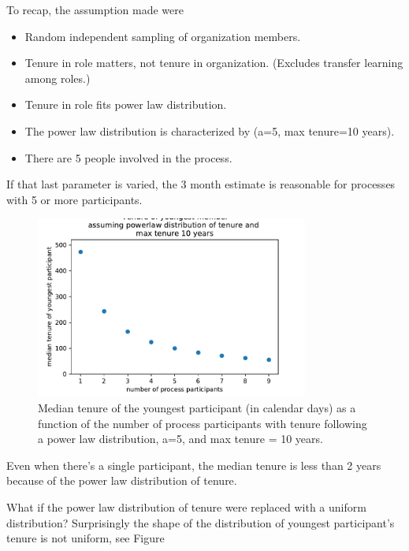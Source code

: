 To recap, the assumption made were
\begin{itemize}
    \item Random independent sampling of organization members. 
    \item Tenure in role matters, not tenure in organization. (Excludes transfer learning among roles.)
    \item Tenure in role fits power law distribution.
    \item The power law distribution is characterized by (a=5, max tenure=10 years). 
    \item There are 5 people involved in the process.
\end{itemize}
If that last parameter is varied, the 3 month estimate is reasonable for processes with 5 or more participants.

\begin{figure}[H]
    \centering
    \includegraphics[width=0.8\textwidth]{images/tenure_power_distribution_a5_with_max_tenure10.pdf}
    \caption{Median tenure of the youngest participant (in calendar days) as a function of the number of process participants with tenure following a power law distribution, a=5, and max tenure = 10 years.}
    \label{fig:tenure-powerlaw-5-participants}
\end{figure}


Even when there's a single participant, the median tenure is less than 2 years because of the power law distribution of tenure.

What if the power law distribution of tenure were replaced with a uniform distribution?
Surprisingly the shape of the distribution of youngest participant's tenure is not uniform, see Figure

